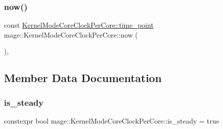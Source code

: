 \subsubsection{\texorpdfstring{now()}{now()}}
{\footnotesize\ttfamily const \mbox{\hyperlink{structmage_1_1_kernel_mode_core_clock_per_core_a26d0fe6b051dab6987956f52414659cc}{Kernel\+Mode\+Core\+Clock\+Per\+Core\+::time\+\_\+point}} mage\+::\+Kernel\+Mode\+Core\+Clock\+Per\+Core\+::now (\begin{DoxyParamCaption}{ }\end{DoxyParamCaption})\hspace{0.3cm}{\ttfamily [static]}, {\ttfamily [noexcept]}}



\subsection{Member Data Documentation}
\mbox{\label{structmage_1_1_kernel_mode_core_clock_per_core_a8b87465ab1497015a4f6436fd4637645}} 
\subsubsection{\texorpdfstring{is\+\_\+steady}{is\_steady}}
{\footnotesize\ttfamily constexpr bool mage\+::\+Kernel\+Mode\+Core\+Clock\+Per\+Core\+::is\+\_\+steady = true\hspace{0.3cm}{\ttfamily [static]}}

